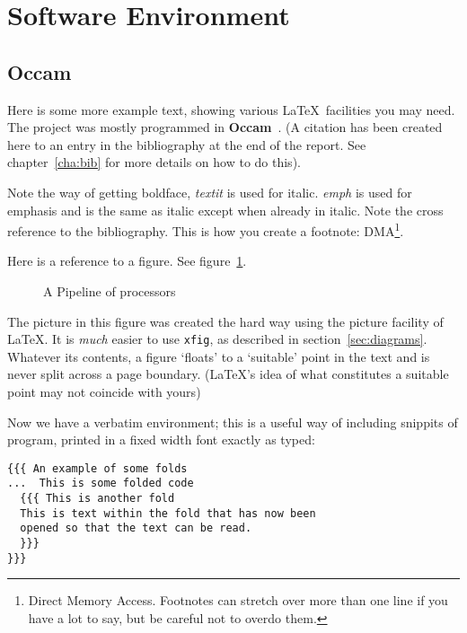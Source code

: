 \section{Software Environment}
\subsection{Occam}

Here is some more example text, showing various \LaTeX\ facilities
you may need.  The project was mostly programmed in
\textbf{Occam}~\cite{occam}.  (A citation has been created  here to an
entry in the bibliography at the end of the report. See
chapter~\ref{cha:bib} for more details on how to do this).

Note the way of getting boldface, \textit{textit} is used for italic.
\emph{emph} is used for emphasis and is the same as italic except when
already in italic.  Note the cross reference to the bibliography.
This is how you create a footnote: DMA\footnote{Direct Memory Access.
	Footnotes can stretch over more than one line if you have a lot to
	say, but be careful not to overdo them.}.

Here is a reference to a figure. See figure~\ref{pipeline}.
\begin{figure}[htbp]
	\centering
	
	\caption{A Pipeline of processors
		\label{pipeline}}           %
\end{figure}
The picture in this figure was created the hard way using the picture
facility of \LaTeX. It is \emph{much} easier to use \texttt{xfig}, as
described in section~\ref{sec:diagrams}.  Whatever its contents, a
figure `floats' to a `suitable' point in the text and is never split
across a page boundary. (\LaTeX's idea of what constitutes a suitable
point may not coincide with yours)


Now we have a verbatim environment; this is a useful way of including
snippits of program, printed in a fixed width font exactly as typed:

\begin{verbatim}
{{{ An example of some folds
...  This is some folded code
  {{{ This is another fold
  This is text within the fold that has now been
  opened so that the text can be read.
  }}}
}}}
\end{verbatim}



